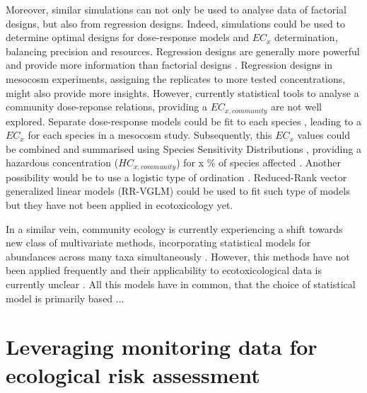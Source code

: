 Moreover, similar simulations can not only be used to analyse data of factorial designs, but also from regression designs.
Indeed, simulations could be used to determine optimal designs for dose-response models and $EC_x$ determination, balancing precision and resources. 
Regression designs are generally more powerful and provide more information than factorial designs  \citep{cottingham_knowing_2005}. 
Regression designs in mesocosm experiments, assigning the replicates to more tested concentrations, might also provide more insights.
However, currently statistical tools to analyse a community dose-reponse relations, providing a $EC_{x, community}$ are not well explored.
Separate dose-response models could be fit to each species \citep{ritz_toward_2010}, leading to a $EC_x$ for each species in a mesocosm study.
Subsequently, this $EC_x$ values could be combined and summarised using Species Sensitivity Distributions \citep{posthuma_species_2002}, providing a 
hazardous concentration ($HC_{x, community}$) for x \% of species affected \citep{maltby_insecticide_2005}. 
Another possibility would be to use a logistic type of ordination \citep{van_den_brink_multivariate_2003}. 
Reduced-Rank vector generalized linear models (RR-VGLM) could be used to fit such type of models \citep{yee_reduced-rank_2003, yee_vector_2015} but they have not been applied in ecotoxicology yet.

In a similar vein, community ecology is currently experiencing a shift towards new class of multivariate methods, incorporating statistical models for abundances across many taxa simultaneously \citep{warton_model-based_2015, warton_distance-based_2012, warton_so_2015, ter_braak_topics_2014}.
However, this methods have not been applied frequently and their applicability to ecotoxicological data is currently unclear \citep{szocs_analysing_2015}. 
All this models have in common, that the choice of statistical model is primarily based ...




\section{Leveraging monitoring data for ecological risk assessment}

